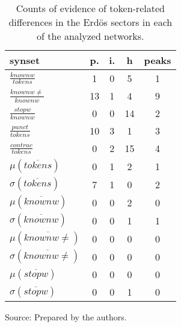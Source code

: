 \begin{table}[h!]
\begin{center}
\caption{Counts of evidence of token-related differences in the Erd\"os sectors in each of the analyzed networks.}
	\def\arraystretch{1.5}
\begin{tabular}{| l || c | c | c || c |}\hline
{\bf synset} & {\bf p.} & {\bf i.} & {\bf h} & {\bf peaks} \\\hline\hline
$\frac{knownw}{tokens}$ & 1  & 0  & 5  & 1 \\
$\frac{knownw \neq}{knownw}$ & 13  & 1  & 4  & 9 \\
$\frac{stopw}{knownw}$ & 0  & 0  & 14  & 2 \\
$\frac{punct}{tokens}$ & 10  & 3  & 1  & 3 \\
$\frac{contrac}{tokens}$ & 0  & 2  & 15  & 4 \\\hline
$\mu(\overline{tokens})$ & 0  & 1  & 2  & 1 \\
$\sigma(\overline{tokens})$ & 7  & 1  & 0  & 2 \\\hline
$\mu(\overline{knownw})$ & 0  & 0  & 2  & 0 \\
$\sigma(\overline{knownw})$ & 0  & 0  & 1  & 1 \\\hline
$\mu(\overline{knownw \neq})$ & 0  & 0  & 0  & 0 \\
$\sigma(\overline{knownw \neq})$ & 0  & 0  & 0  & 0 \\\hline
$\mu(\overline{stopw})$ & 0  & 0  & 0  & 0 \\
$\sigma(\overline{stopw})$ & 0  & 0  & 1  & 0 \\\hline
\end{tabular}
\begin{flushleft}
		Source: Prepared by the authors.\
\end{flushleft}
\end{center}
\end{table}
